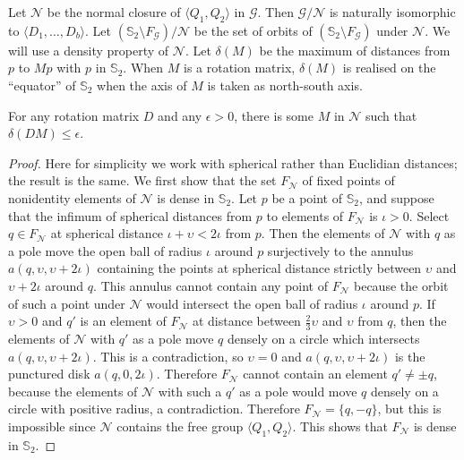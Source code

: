 \documentclass{lmcs}
\begin{document}
Let $\mathcal{N}$ be the normal closure of $\langle Q_1, Q_2 \rangle$ in $\mathcal{G}$. 
Then $\mathcal{G}/\mathcal{N}$  is naturally isomorphic to $\langle D_1, \ldots, D_b \rangle$.
Let $(\mathbb{S}_2\setminus F_{\mathcal{G}})/\mathcal{N}$ be the set of orbits of $(\mathbb{S}_2 \setminus F_{\mathcal{G}})$ under $\mathcal{N}$. 
We will use a density property
of $\mathcal{N}$. Let $\delta(M)$ be the maximum of distances from $p$ to $Mp$ with $p$ in $\mathbb{S}_2$. When $M$ is a rotation matrix,
$\delta(M)$ is realised on the ``equator'' of $\mathbb{S}_2$ when the axis of $M$ is taken as north-south axis.
\begin{lem}\label{tech}
For any rotation matrix $D$ and any $\epsilon > 0$, there is some $M$ in $\mathcal{N}$ such that
$\delta(DM) \leq \epsilon$.
\end{lem}
\begin{proof}
Here for simplicity we work with spherical rather than Euclidian distances; the result is the same.
We first show that the set $F_{\mathcal{N}}$ of fixed points of nonidentity elements of $\mathcal{N}$ is dense in $\mathbb{S}_2$.
Let $p$ be a point of $\mathbb{S}_2$, and suppose that the infimum of spherical distances from $p$ to elements of $F_{\mathcal{N}}$ is
$\iota > 0$. Select $q \in F_{\mathcal{N}}$ at spherical distance 
$\iota + \upsilon < 2\iota$ from $p$. Then the elements of 
$\mathcal{N}$ with $q$ as a pole move the open ball of radius 
$\iota$ around  $p$ surjectively to the annulus 
$a(q,\upsilon,\upsilon+2\iota)$ containing the points at spherical distance strictly between 
$\upsilon$ and $\upsilon + 2\iota$ around $q$. This annulus cannot contain any point of $F_{\mathcal{N}}$
because the orbit of such a point under $\mathcal{N}$ would intersect the open ball of radius $\iota$ around $p$.
If $\upsilon > 0$ and $q'$ is an element of  $F_{\mathcal{N}}$
at distance between $\frac{2}{3} \upsilon$ and $\upsilon$
from $q$, then the elements of $\mathcal{N}$ with $q'$
as a pole move $q$ densely on a circle which intersects
$a(q,\upsilon,\upsilon+2\iota)$. This is a contradiction,
so $\upsilon = 0$ and $a(q,\upsilon,\upsilon+2\iota)$
is the punctured disk $a(q,0,2\iota)$.
Therefore $F_{\mathcal{N}}$ cannot contain an element
$q' \neq \pm q$, because the elements of $\mathcal{N}$
with such a $q'$ as a pole would move $q$ densely on a circle with positive radius, a contradiction.
Therefore $F_{\mathcal{N}} = \{q, -q\}$, but this is impossible
since $\mathcal{N}$ contains the free group 
$\langle Q_1, Q_2 \rangle$.
This shows that $F_{\mathcal{N}}$ is dense in $\mathbb{S}_2$.


\end{proof}
\end{document}
